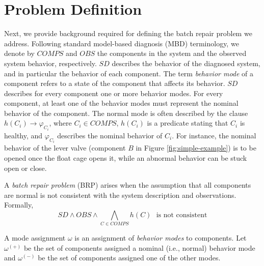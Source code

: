 \documentclass[letterpaper]{article}
\newcommand\meir[1]{\textcolor{red}{meir: #1}}
\newcommand{\COMPS}{\textit{COMPS}}
\newcommand{\SD}{\textit{SD}}
\newcommand{\OBS}{\textit{OBS}}
\begin{document}
\section{Problem Definition}
Next, we provide background required for defining the batch repair problem we address. %
Following standard model-based diagnosis (MBD) terminology, we denote by $\COMPS$ and $\OBS$ the components in the system and the observed system behavior, respectively. $\SD$ describes the behavior of the diagnosed system, and in particular the behavior of each component. The term {\em behavior mode} of a component refers to a state of the component that affects its behavior. $\SD$ describes for every component one or more behavior modes. For every component, at least one of the behavior modes must represent the nominal behavior of the component. The normal mode is often described by the clause $h(C_i) \rightarrow \varphi_{C_i}$, where $C_i\in \COMPS$, $h(C_i)$ is a predicate stating that $C_i$ is healthy, and $\varphi_{C_i}$ describes the nominal behavior of $C_i$. For instance, the nominal behavior of the lever valve (component $B$ in Figure \ref{fig:simple-example}) is to be opened once the float cage opens it, while an abnormal behavior can be stuck open or close.

A {\em batch repair problem} (BRP) arises when the assumption that all components are normal is not consistent with the system description and observations. Formally,
\[ \SD \wedge \OBS \wedge \bigwedge_{C\in \COMPS} h(C) ~~~ \text{is not consistent} \]

A mode assignment $\omega$ is an assignment of {\em behavior modes} to components. Let $\omega^{(+)}$ be the set of components assigned a nominal (i.e., normal) behavior mode and $\omega^{(-)}$ be the set of components assigned one of the other modes.


\end{document}
